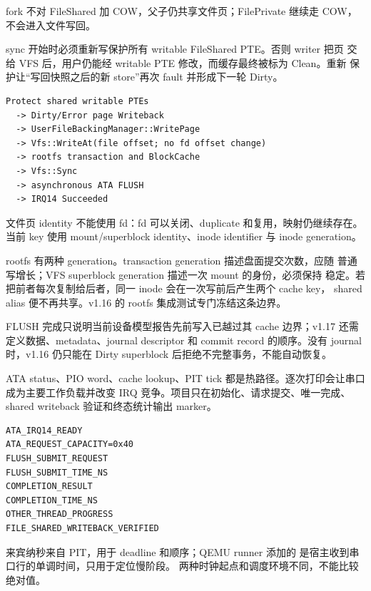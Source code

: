 fork 不对 FileShared 加 COW，父子仍共享文件页；FilePrivate 继续走 COW，
不会进入文件写回。

sync 开始时必须重新写保护所有 writable FileShared PTE。否则 writer 把页
交给 VFS 后，用户仍能经 writable PTE 修改，而缓存最终被标为 Clean。重新
保护让“写回快照之后的新 store”再次 fault 并形成下一轮 Dirty。

\par
\begin{lstlisting}
Protect shared writable PTEs
  -> Dirty/Error page Writeback
  -> UserFileBackingManager::WritePage
  -> Vfs::WriteAt(file offset; no fd offset change)
  -> rootfs transaction and BlockCache
  -> Vfs::Sync
  -> asynchronous ATA FLUSH
  -> IRQ14 Succeeded
\end{lstlisting}

文件页 identity 不能使用 fd：fd 可以关闭、duplicate 和复用，映射仍继续存在。
当前 key 使用 mount/superblock identity、inode identifier 与 inode
generation。

rootfs 有两种 generation。transaction generation 描述盘面提交次数，应随
普通写增长；VFS superblock generation 描述一次 mount 的身份，必须保持
稳定。若把前者每次复制给后者，同一 inode 会在一次写前后产生两个 cache key，
shared alias 便不再共享。v1.16 的 rootfs 集成测试专门冻结这条边界。

FLUSH 完成只说明当前设备模型报告先前写入已越过其 cache 边界；v1.17 还需
定义数据、metadata、journal descriptor 和 commit record 的顺序。没有
journal 时，v1.16 仍只能在 Dirty superblock 后拒绝不完整事务，不能自动恢复。

ATA status、PIO word、cache lookup、PIT tick 都是热路径。逐次打印会让串口
成为主要工作负载并改变 IRQ 竞争。项目只在初始化、请求提交、唯一完成、
shared writeback 验证和终态统计输出 marker。

\begin{lstlisting}
ATA_IRQ14_READY
ATA_REQUEST_CAPACITY=0x40
FLUSH_SUBMIT_REQUEST
FLUSH_SUBMIT_TIME_NS
COMPLETION_RESULT
COMPLETION_TIME_NS
OTHER_THREAD_PROGRESS
FILE_SHARED_WRITEBACK_VERIFIED
\end{lstlisting}

来宾纳秒来自 PIT，用于 deadline 和顺序；QEMU runner 添加的
\code{[QEMU][T+...ms]} 是宿主收到串口行的单调时间，只用于定位慢阶段。
两种时钟起点和调度环境不同，不能比较绝对值。

